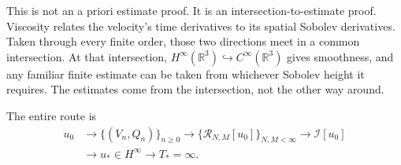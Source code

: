\documentclass[11pt]{article}
\begin{document}
This is not an a priori estimate proof.  It is an intersection-to-estimate proof.  Viscosity relates the velocity's time derivatives to its spatial Sobolev derivatives.  Taken through every finite order, those two directions meet in a common intersection.  At that intersection, \(H^\infty(\mathbb R^3)\hookrightarrow C^\infty(\mathbb R^3)\) gives smoothness, and any familiar finite estimate can be taken from whichever Sobolev height it requires.  The estimates come from the intersection, not the other way around.

The entire route is
\[
\begin{aligned}
u_0
&\longrightarrow \{(V_n,Q_n)\}_{n\geq0}
\longrightarrow \{\mathcal R_{N,M}[u_0]\}_{N,M<\infty}
\longrightarrow \mathcal I[u_0]\\
&\longrightarrow u_*\in H^\infty
\longrightarrow T_*=\infty.
\end{aligned}
\]
\end{document}
